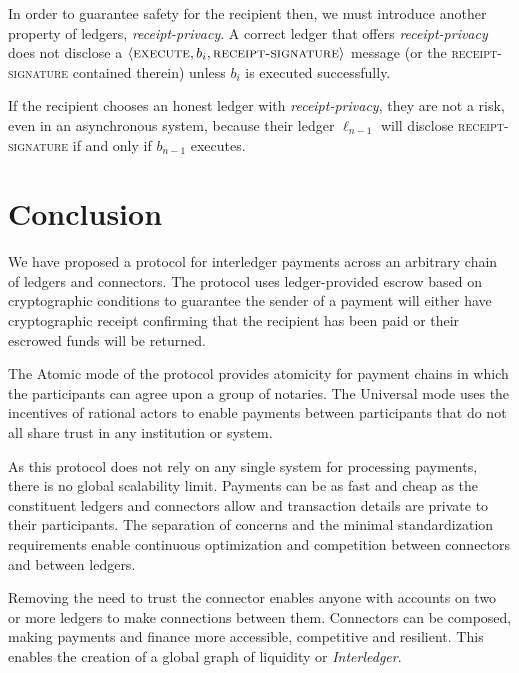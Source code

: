 \documentclass[letterpaper,twocolumn,10pt]{article}
\begin{document}
In order to guarantee safety for the recipient then, we must introduce another property of ledgers, \textit{receipt-privacy}. A correct ledger that offers \textit{receipt-privacy} does not disclose a $\langle\textsc{execute}, b_i, \textsc{receipt-signature}\rangle$ message (or the \textsc{receipt-signature} contained therein) unless $b_i$ is executed successfully.

If the recipient chooses an honest ledger with \textit{receipt-privacy}, they are not a risk, even in an asynchronous system, because their ledger $\ell_{n-1}$ will disclose \textsc{receipt-signature} if and only if $b_{n-1}$ executes.


\section{Conclusion}

We have proposed a protocol for interledger payments across an arbitrary chain of ledgers and connectors. The protocol uses ledger-provided escrow based on cryptographic conditions to guarantee the sender of a payment will either have cryptographic receipt confirming that the recipient has been paid or their escrowed funds will be returned.

The Atomic mode of the protocol provides atomicity for payment chains in which the participants can agree upon a group of notaries. The Universal mode uses the incentives of rational actors to enable payments between participants that do not all share trust in any institution or system.

As this protocol does not rely on any single system for processing payments, there is no global scalability limit. Payments can be as fast and cheap as the constituent ledgers and connectors allow and transaction details are private to their participants. The separation of concerns and the minimal standardization requirements enable continuous optimization and competition between connectors and between ledgers.

Removing the need to trust the connector enables anyone with accounts on two or more ledgers to make connections between them. Connectors can be composed, making payments and finance more accessible, competitive and resilient. This enables the creation of a global graph of liquidity or \textit{Interledger}.




\end{document}
